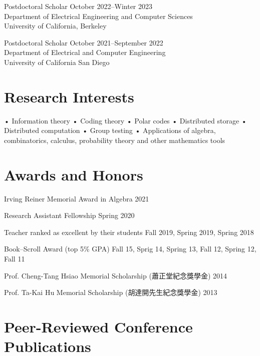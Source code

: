 \documentclass{article}
\begin{document}
Postdoctoral Scholar                 \hfill October 2022--Winter 2023 \\
Department of Electrical Engineering and Computer Sciences            \\
University of California, Berkeley

Postdoctoral Scholar              \hfill October 2021--September 2022 \\
Department of Electrical and Computer Engineering                     \\
University of California San Diego

\section{Research Interests}

• Information theory
• Coding theory
• Polar codes
• Distributed storage
• Distributed computation
• Group testing
• Applications of algebra, combinatorics, calculus, probability theory
  and other mathematics tools

\section{Awards and Honors}

Irving Reiner Memorial Award in Algebra                      \hfill 2021

Research Assistant Fellowship                         \hfill Spring 2020

Teacher ranked as excellent by their students
                              \hfill Fall 2019, Spring 2019, Spring 2018

Book--Scroll Award (top 5\% GPA)
        \hfill Fall 15, Sprig 14, Spring 13, Fall 12, Spring 12, Fall 11

Prof. Cheng-Tang Hsiao Memorial Scholarship ({\zhfamily 蕭正堂紀念獎學金})
                                                             \hfill 2014

Prof. Ta-Kai Hu Memorial Scholarship ({\zhfamily 胡達開先生紀念獎學金})
                                                             \hfill 2013

\section{Peer-Reviewed Conference Publications}
\end{document}
